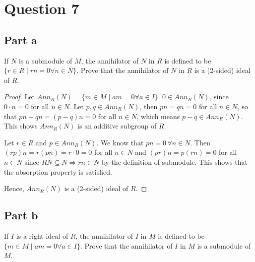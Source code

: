 \section{Question 7}


\subsection{Part a}

\begin{question}
    If $N$ is a submodule of $M$, the annihilator of $N$ in $R$ is defined to be $\{r \in R \mid r n=0 \forall n \in N\}$. Prove that the annihilator of $N$ in $R$ is a (2-sided) ideal of $R$.
\end{question}

\begin{answer}
    \begin{proof}
        Let $Ann_R(N) = \{m \in M \mid a m=0 \forall a \in I\}$. $0 \in Ann_{R}(N)$, since $0 \cdot n = 0$ for all $n \in N$. Let $p,q \in Ann_R(N)$, then $pn = qn = 0$ for all $n \in N$, so that $pn - qn = (p - q)n = 0$ for all $n \in N$, which means $p-q \in Ann_R(N)$. This shows $Ann_{R}(N)$ is an additive subgroup of $R$.
        
        Let $r \in R$ and $p \in Ann_R(N)$. We know that $pn = 0\, \forall n \in N$. Then $(rp)n = r(pn) = r\cdot 0 = 0$ for all $n \in N$ and $(pr)n = p(rn) = 0$ for all $n \in N$ since $RN \subseteq N \Rightarrow rn \in N$ by the definition of submodule. This shows that the absorption property is satisfied.
        
        Hence, $Ann_R(N)$ is a ($2$-sided) ideal of $R$.
    \end{proof}
\end{answer}

\subsection{Part b}

\begin{question}
    If $I$ is a right ideal of $R$, the annihilator of $I$ in $M$ is defined to be $\{m \in M \mid a m=0 \forall a \in I\}$. Prove that the annihilator of $I$ in $M$ is a submodule of $M$.
\end{question}

